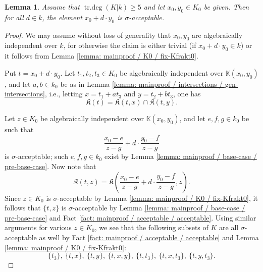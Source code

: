 \documentclass[11pt]{amsart}
\newtheorem{lemma}[proposition]{Lemma}
\theoremstyle{definition}
\theoremstyle{remark}
\numberwithin{equation}{section}
\DeclareMathOperator{\trdeg}{tr.deg}
\newcommand{\Kbb}{\mathbb{K}}
\newcommand{\Kfrak}{\mathfrak{K}}
\begin{document}
\begin{lemma}
\label{lemma: mainproof / base-case / main-base-case}
  Assume that $\trdeg(K|k) \geq 5$ and let $x_0,y_0 \in K_0$ be given.
  Then for all $d \in k$, the element $x_0+d\cdot y_0$ is $\sigma$-acceptable.
\end{lemma}
\begin{proof}
  We may assume without loss of generality that $x_0,y_0$ are algebraically independent over $k$, for otherwise the claim is either trivial (if $x_0+d \cdot y_0 \in k$) or it follows from Lemma \ref{lemma: mainproof / K0 / fix-Kfrakt0}.

  Put $t = x_0+d \cdot y_0$.
  Let $t_1,t_2,t_3 \in K_0$ be algebraically independent over $\Kbb(x_0,y_0)$, and let $a,b \in k_0$ be as in Lemma \ref{lemma: mainproof / intersections / gen-intersections}, i.e., letting $x = t_1+at_3$ and $y = t_2 + b t_3$, one has
  \[ \Kfrak(t) = \Kfrak(t,x) \cap \Kfrak(t,y). \]

  Let $z \in K_0$ be algebraically independent over $\Kbb(x_0,y_0)$, and let $e,f,g \in k_0$ be such that 
  \[ \frac{x_0-e}{z-g}+d\cdot\frac{y_0-f}{z-g} \]
  is $\sigma$-acceptable; such $e,f,g \in k_0$ exist by Lemma \ref{lemma: mainproof / base-case / pre-base-case}.
  Now note that
  \[ \Kfrak(t,z) = \Kfrak\left(\frac{x_0-e}{z-g}+d \cdot \frac{y_0-f}{z-g},z\right). \]
  Since $z \in K_0$ is $\sigma$-acceptable by Lemma \ref{lemma: mainproof / K0 / fix-Kfrakt0}, it follows that $\{t,z\}$ is $\sigma$-acceptable by Lemma \ref{lemma: mainproof / base-case / pre-base-case} and Fact \ref{fact: mainproof / acceptable / acceptable}.
  Using similar arguments for various $z \in K_0$, we see that the following subsets of $K$ are all $\sigma$-acceptable as well by Fact \ref{fact: mainproof / acceptable / acceptable} and Lemma \ref{lemma: mainproof / K0 / fix-Kfrakt0}:
  \[ \{t_3\}, \ \{t,x\}, \ \{t,y\}, \ \{t,x,y\}, \ \{t,t_3\}, \ \{t,x,t_3\}, \ \{t,y,t_3\}. \]


\end{proof}
\end{document}
